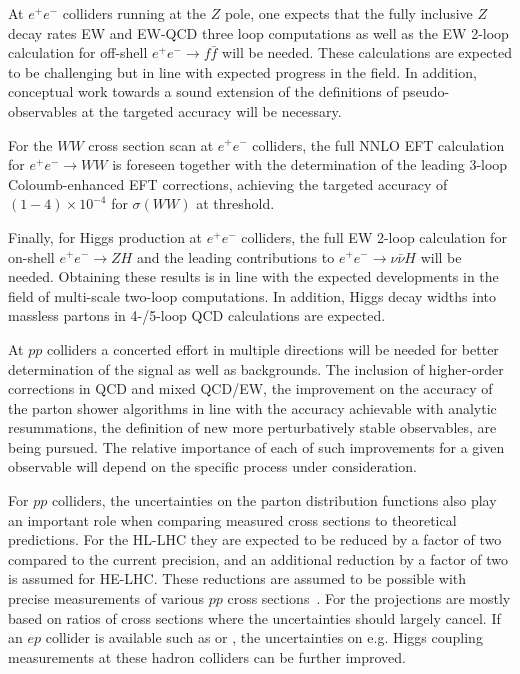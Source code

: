 \documentclass[../report.tex]{subfiles}
\begin{document}
At $e^+e^-$ colliders running at the $Z$ pole, one expects that the fully inclusive $Z$ decay rates EW and EW-QCD three loop computations as well as the EW 2-loop calculation for off-shell $e^+e^- \to f\bar{f}$ will be needed.  These calculations are expected to be challenging but in line with expected progress in the field. In addition, conceptual work towards a sound extension of the definitions of pseudo-observables at the targeted accuracy will be necessary. 

For the $WW$ cross section scan at $e^+e^-$ colliders, the full NNLO EFT calculation for $e^+e^- \to WW$ is foreseen together with the determination of the leading 3-loop Coloumb-enhanced EFT corrections, achieving the targeted accuracy of $(1-4) \times 10^{-4}$ for $\sigma(WW)$ at threshold. 

Finally, for Higgs production at $e^+e^-$ colliders, the full EW 2-loop calculation for on-shell $e^+e^- \to ZH$ and the leading contributions to $e^+ e^-\to \nu \bar{\nu} H$ will be needed. Obtaining these results is in line with the expected developments in the field of multi-scale two-loop computations. In addition, Higgs decay widths into massless partons in 4-/5-loop QCD calculations are expected. 

At $pp$ colliders a concerted effort in multiple directions will be needed for better determination of the signal as well as backgrounds. The inclusion of higher-order corrections in QCD and mixed QCD/EW, the improvement on the accuracy of the parton shower algorithms in line with the accuracy achievable with analytic resummations, the definition of new more perturbatively stable observables, are being pursued. The relative importance of each of such improvements for a given observable will depend on the specific process under consideration. 

For $pp$ colliders, the uncertainties on the parton distribution functions also play an important role when comparing measured cross sections to theoretical predictions. For the HL-LHC they are expected to be reduced by a factor of two compared to the current precision, and an additional reduction by a factor of two is assumed for HE-LHC. These reductions are assumed to be possible with precise measurements of various $pp$ cross sections~\cite{Khalek:2018mdn}. For \FCChh the projections are mostly based on ratios of cross sections where the uncertainties should largely cancel. If an $ep$ collider is available such as \LHeC or \FCCeh, the uncertainties on e.g. Higgs coupling measurements at these hadron colliders can be further improved.
\end{document}
